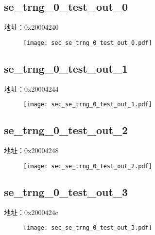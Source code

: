 \subsection{se\_trng\_0\_test\_out\_0}
\label{sec-se-trng-0-test-out-0}
地址：0x20004240
 \begin{figure}[H]
\texttt{[image: sec\_se\_trng\_0\_test\_out\_0.pdf]}
\end{figure}

\subsection{se\_trng\_0\_test\_out\_1}
\label{sec-se-trng-0-test-out-1}
地址：0x20004244
 \begin{figure}[H]
\texttt{[image: sec\_se\_trng\_0\_test\_out\_1.pdf]}
\end{figure}

\subsection{se\_trng\_0\_test\_out\_2}
\label{sec-se-trng-0-test-out-2}
地址：0x20004248
 \begin{figure}[H]
\texttt{[image: sec\_se\_trng\_0\_test\_out\_2.pdf]}
\end{figure}

\subsection{se\_trng\_0\_test\_out\_3}
\label{sec-se-trng-0-test-out-3}
地址：0x2000424c
 \begin{figure}[H]
\texttt{[image: sec\_se\_trng\_0\_test\_out\_3.pdf]}
\end{figure}


